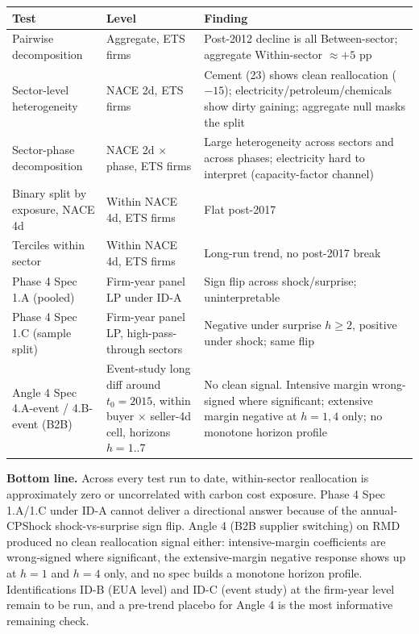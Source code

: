 \documentclass[11pt]{article}
\begin{document}
\begin{center}
\begin{tabular}{p{5.5cm}p{4cm}p{5cm}}
\toprule
Test & Level & Finding \\
\midrule
Pairwise decomposition                    & Aggregate, ETS firms                      & Post-2012 decline is all Between-sector; aggregate Within-sector $\approx +5$ pp \\
Sector-level heterogeneity                & NACE 2d, ETS firms                        & Cement (23) shows clean reallocation ($-15$); electricity/petroleum/chemicals show dirty gaining; aggregate null masks the split \\
Sector-phase decomposition                & NACE 2d $\times$ phase, ETS firms         & Large heterogeneity across sectors and across phases; electricity hard to interpret (capacity-factor channel) \\
Binary split by exposure, NACE 4d         & Within NACE 4d, ETS firms                 & Flat post-2017 \\
Terciles within sector                    & Within NACE 4d, ETS firms                 & Long-run trend, no post-2017 break \\
Phase 4 Spec 1.A (pooled)                 & Firm-year panel LP under ID-A             & Sign flip across shock/surprise; uninterpretable \\
Phase 4 Spec 1.C (sample split)           & Firm-year panel LP, high-pass-through sectors & Negative under surprise $h\geq 2$, positive under shock; same flip \\
Angle 4 Spec 4.A-event / 4.B-event (B2B) & Event-study long diff around $t_0=2015$, within buyer $\times$ seller-4d cell, horizons $h=1..7$ & No clean signal. Intensive margin wrong-signed where significant; extensive margin negative at $h=1,4$ only; no monotone horizon profile \\
\bottomrule
\end{tabular}
\end{center}

\textbf{Bottom line.} Across every test run to date, within-sector reallocation is approximately zero or uncorrelated with carbon cost exposure. Phase 4 Spec 1.A/1.C under ID-A cannot deliver a directional answer because of the annual-CPShock shock-vs-surprise sign flip. Angle 4 (B2B supplier switching) on RMD produced no clean reallocation signal either: intensive-margin coefficients are wrong-signed where significant, the extensive-margin negative response shows up at $h=1$ and $h=4$ only, and no spec builds a monotone horizon profile. Identifications ID-B (EUA level) and ID-C (event study) at the firm-year level remain to be run, and a pre-trend placebo for Angle 4 is the most informative remaining check.
\end{document}
